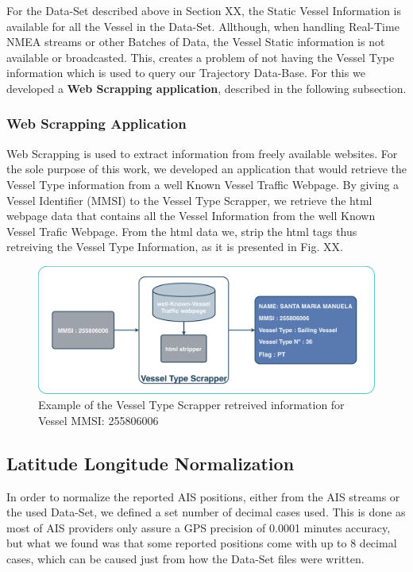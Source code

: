 For the Data-Set described above in Section XX, the Static Vessel Information is available for all the Vessel in the Data-Set. Allthough, when handling Real-Time NMEA streams or other Batches of Data, the Vessel Static information is not available or broadcasted. This, creates a problem of not having the Vessel Type information which is used to query our Trajectory Data-Base.
For this we developed a \textbf{Web Scrapping application}, described in the following subsection.

\subsubsection{Web Scrapping Application}
Web Scrapping is used to extract information from freely available websites. For the sole purpose of this work, we developed an application that would retrieve the Vessel Type information from a well Known Vessel Traffic Webpage.
By giving a Vessel Identifier (MMSI) to the Vessel Type Scrapper, we retrieve the html webpage data that contains all the Vessel Information from the well Known Vessel Trafic Webpage. From the html data we, strip the html tags thus retreiving the Vessel Type Information, as it is presented in Fig. XX.


\begin{figure}[H]
	\centering
	\includegraphics[scale = .4]{figures/Ch4/scrapper}
    \caption{Example of the Vessel Type Scrapper retreived information for Vessel MMSI: 255806006}
    \label{fig:DSSSSS}
\end{figure}


\subsection{Latitude Longitude Normalization}
In order to normalize the reported AIS positions, either from the AIS streams or the used Data-Set, we defined a set number of decimal cases used. This is done as most of AIS providers only assure a GPS precision of 0.0001 minutes accuracy, but what we found was that some reported positions come with up to 8 decimal cases, which can be caused just from how the Data-Set files were written.

